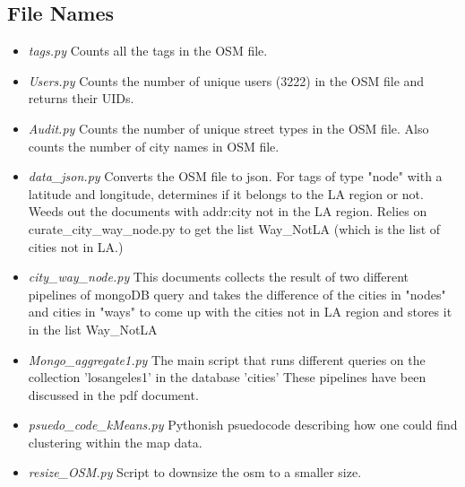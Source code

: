 \documentclass[]{article}
\begin{document}
\center{ \noindent\rule{8cm}{0.4pt}}

\subsection*{File Names}
\begin{itemize}
\item \emph{tags.py}
Counts all the tags in the OSM file.

\item \emph{Users.py}
Counts the number of unique users (3222) in the OSM file and returns their UIDs.
 
\item \emph{Audit.py}
Counts the number of unique street types in the OSM file.
Also counts the number of city names in OSM file.


\item \emph{data\_json.py}
Converts the OSM file to json.
For tags of type "node" with a latitude and longitude, determines if it belongs to the LA region or not.
Weeds out the documents with addr:city not in the LA region.
Relies on curate\_city\_way\_node.py to get the list Way\_NotLA (which is the list of cities not in LA.)

\item \emph{city\_way\_node.py}
This documents collects the result of two different pipelines of mongoDB query 
and takes the difference of the cities in "nodes" and cities in "ways" to come up with the cities not in LA region and stores it in the list Way\_NotLA

\item \emph{Mongo\_aggregate1.py}
The main script that runs different queries on the collection 'losangeles1' in the database 'cities'
These pipelines have been discussed in the pdf document.

\item \emph{psuedo\_code\_kMeans.py}
Pythonish psuedocode describing how one could find clustering within the map data.

\item \emph{resize\_OSM.py}
Script to downsize the osm to a smaller size.
\end{itemize}
\end{document}

